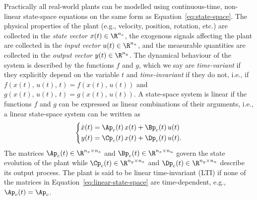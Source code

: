 Practically all real-world plants can be modelled using continuous-time, non-linear state-space equations on the same form as Equation~\eqref{eq:state-space}.
The physical properties of the plant (e.g., velocity, position, rotation, etc.) are collected in the \emph{state vector} $x(t) \in \R^{n_x}$, the exogenous signals affecting the plant are collected in the \emph{input vector} $u(t) \in \R^{n_u}$, and the measurable quantities are collected in the \emph{output vector} $y(t) \in \R^{n_y}$.
The dynamical behaviour of the system is described by the functions $f$ and $g$, which we say are \emph{time-variant} if they explicitly depend on the variable $t$ and \emph{time-invariant} if they do not, i.e., if $f(x(t),\, u(t),\, t) = f(x(t),\, u(t))$ and $g(x(t),\, u(t),\, t) = g(x(t),\, u(t))$.
A state-space system is linear if the functions $f$ and $g$ can be expressed as linear combinations of their arguments, i.e., a linear state-space system can be written as
%
\begin{equation}%
    \label{eq:linear-state-space}%
    \left\{\begin{aligned}
        \dot{x}(t) &= \Ap_c(t)\,x(t) + \Bp_c(t)\,u(t) \\
        y(t) &= \Cp_c(t)\,x(t) + \Dp_c(t)\,u(t). \\
    \end{aligned}\right.
\end{equation}
%
The matrices $\Ap_c(t) \in \R^{n_x \times n_x}$ and $\Bp_c(t) \in \R^{n_x \times n_u}$ govern the state evolution of the plant while $\Cp_c(t) \in \R^{n_y \times n_x}$ and $\Dp_c(t) \in \R^{n_y \times n_u}$ describe its output process.
The plant is said to be linear time-invariant (LTI) if none of the matrices in Equation~\eqref{eq:linear-state-space} are time-dependent, e.g., $\Ap_c(t) = \Ap_c$.

